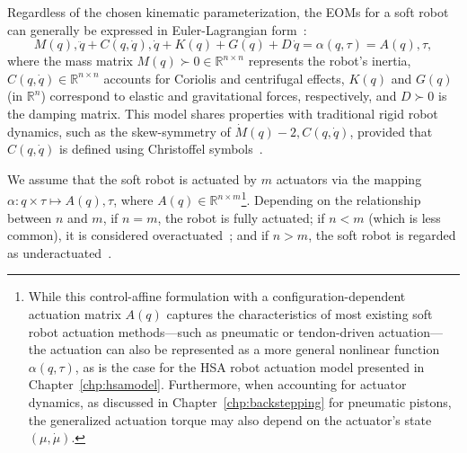 Regardless of the chosen kinematic parameterization, the \glspl{EOM} for a soft robot can generally be expressed in Euler-Lagrangian form~\citep{della2023model}:
\begin{equation}\label{eq:background:dynamics:eom}
M(q) , \ddot{q} + C(q, \dot{q}) , \dot{q} + K(q) + G(q) + D \, \dot{q} = \alpha(q,\tau) = A(q) , \tau,
\end{equation}
where the mass matrix $M(q) \succ 0 \in \mathbb{R}^{n \times n}$ represents the robot’s inertia, $C(q,\dot{q}) \in \mathbb{R}^{n \times n}$ accounts for Coriolis and centrifugal effects, $K(q)$ and $G(q)$ (in $\mathbb{R}^{n}$) correspond to elastic and gravitational forces, respectively, and $D \succ 0$ is the damping matrix. This model shares properties with traditional rigid robot dynamics, such as the skew-symmetry of $\dot{M}(q) - 2 , C(q,\dot{q})$, provided that $C(q,\dot{q})$ is defined using Christoffel symbols~\citep{della2020model}.

We assume that the soft robot is actuated by $m$ actuators via the mapping $\alpha: q \times \tau \mapsto A(q) , \tau$, where $A(q) \in \mathbb{R}^{n \times m}$\footnote{While this control-affine formulation with a configuration-dependent actuation matrix $A(q)$ captures the characteristics of most existing soft robot actuation methods—such as pneumatic or tendon-driven actuation—the actuation can also be represented as a more general nonlinear function $\alpha(q,\tau)$, as is the case for the \gls{HSA} robot actuation model presented in Chapter~\ref{chp:hsamodel}. Furthermore, when accounting for actuator dynamics, as discussed in Chapter~\ref{chp:backstepping} for pneumatic pistons, the generalized actuation torque may also depend on the actuator’s state $(\mu,\dot{\mu})$.}. 
Depending on the relationship between $n$ and $m$, if $n=m$, the robot is fully actuated; if $n < m$ (which is less common), it is considered overactuated~\citep{pustina2024input}; and if $n > m$, the soft robot is regarded as underactuated~\citep{pustina2025analysis}.

